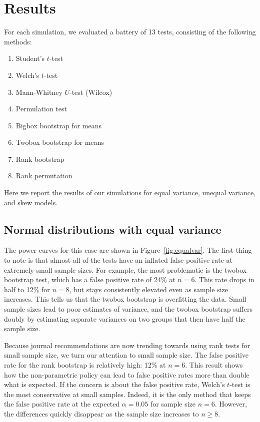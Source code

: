 \documentclass[10pt]{article} %
\begin{document}
\section{Results}
For each simulation, we evaluated a battery of 13 tests, consisting of the following methods:
\begin{enumerate}
\setlength\itemindent{.25in}
\setlength\itemsep{0ex}
\item Student's $t$-test
\item Welch's $t$-test 
\item Mann-Whitney $U$-test (Wilcox)
\item Permulation test
\item Bigbox bootstrap for means 
\item Twobox bootstrap for means
\item Rank bootstrap
\item Rank permutation 
\end{enumerate} 

\noindent Here we report the results of our simulations for equal variance, unequal variance, and skew models.

\subsection{Normal distributions with equal variance}
The power curves for this case are shown in Figure~\ref{fig:equalvar}. The first thing to note is that almost all of the tests have an inflated false positive rate at extremely small sample sizes. For example, the most problematic is the twobox bootstrap test, which has a false positive rate of 24\% at $n=6$. This rate drops in half to 12\% for $n=8$, but stays consistently elevated even as sample size increases. This tells us that the twobox bootstrap is overfitting the data. Small sample sizes lead to poor estimates of variance, and the twobox bootstrap suffers doubly by estimating separate variances on two groups that then have half the sample size. 

Because journal recommendations are now trending towards using rank tests for small sample size, we turn our attention to small sample size. The false positive rate for the rank bootstrap is relatively high: 12\% at $n=6$. This result shows how the non-parametric policy can lead to false positive rates more than double what is expected. If the concern is about the false positive rate, Welch's $t$-test is the most conservative at small samples. Indeed, it is the only method that keeps the false positive rate at the expected $\alpha=0.05$ for sample size $n=6$. However, the differences quickly disappear as the sample size increases to $n\geq8$. 
\end{document}
